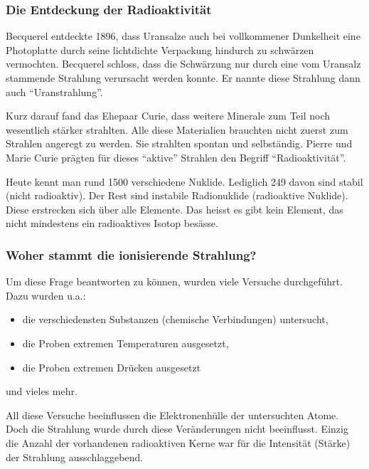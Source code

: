 \documentclass[12pt,a4paper,twoside]{article}
\begin{document}
\subsubsection*{Die Entdeckung der Radioaktivität}

Becquerel entdeckte 1896, dass Uransalze auch bei vollkommener Dunkelheit eine Photoplatte durch seine lichtdichte
Verpackung hindurch zu schwärzen vermochten. Becquerel schloss, dass die Schwärzung nur durch eine vom Uransalz 
stammende Strahlung verursacht werden konnte. Er nannte diese Strahlung dann auch ``Uranstrahlung''.

Kurz darauf fand das Ehepaar Curie, dass weitere Minerale zum Teil noch wesentlich stärker strahlten.
Alle diese Materialien brauchten nicht zuerst zum Strahlen angeregt zu werden.
Sie strahlten spontan und selbständig. Pierre und Marie Curie prägten für dieses
``aktive'' Strahlen den Begriff ``Radioaktivität''.


Heute kennt man rund 1500 verschiedene Nuklide. 
Lediglich 249 davon sind stabil (nicht radioaktiv). 
Der Rest sind instabile Radionuklide (radioaktive Nuklide). 
Diese erstrecken sich über alle Elemente. 
Das heisst es gibt kein Element, das nicht mindestens ein radioaktives Isotop besässe.

\subsubsection*{Woher stammt die ionisierende Strahlung?}


Um diese Frage beantworten zu können, wurden viele Versuche durchgeführt. Dazu wurden u.a.:

\begin{itemize}
	\item die verschiedensten Substanzen (chemische Verbindungen) untersucht,
	\item die Proben extremen Temperaturen ausgesetzt,
	\item die Proben extremen Drücken ausgesetzt
\end{itemize}

und vieles mehr.

All diese Versuche beeinflussen die Elektronenhülle der untersuchten Atome. 
Doch die Strahlung wurde durch diese Veränderungen nicht beeinflusst. 
Einzig die Anzahl der vorhandenen radioaktiven Kerne war für die Intensität (Stärke) der Strahlung ausschlaggebend.
\end{document}
